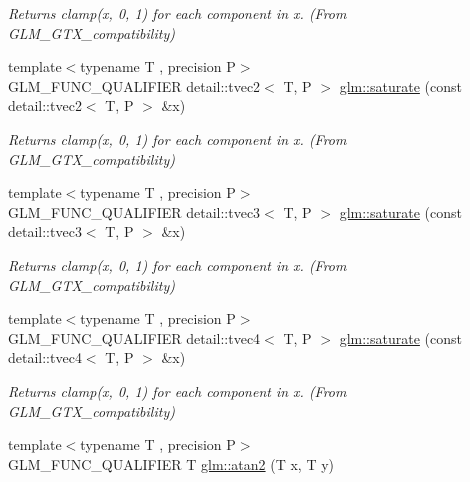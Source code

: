 \begin{DoxyCompactItemize}
\begin{DoxyCompactList}\small\item\em Returns clamp(x, 0, 1) for each component in x. (From G\+L\+M\+\_\+\+G\+T\+X\+\_\+compatibility) \end{DoxyCompactList}\item 
{\footnotesize template$<$typename T , precision P$>$ }\\G\+L\+M\+\_\+\+F\+U\+N\+C\+\_\+\+Q\+U\+A\+L\+I\+F\+I\+ER detail\+::tvec2$<$ T, P $>$ \hyperlink{group__gtx__compatibility_gab7c26da683d068e34feaa3ae90a528c1}{glm\+::saturate} (const detail\+::tvec2$<$ T, P $>$ \&x)\hypertarget{group__gtx__compatibility_gab7c26da683d068e34feaa3ae90a528c1}{}\label{group__gtx__compatibility_gab7c26da683d068e34feaa3ae90a528c1}

\begin{DoxyCompactList}\small\item\em Returns clamp(x, 0, 1) for each component in x. (From G\+L\+M\+\_\+\+G\+T\+X\+\_\+compatibility) \end{DoxyCompactList}\item 
{\footnotesize template$<$typename T , precision P$>$ }\\G\+L\+M\+\_\+\+F\+U\+N\+C\+\_\+\+Q\+U\+A\+L\+I\+F\+I\+ER detail\+::tvec3$<$ T, P $>$ \hyperlink{group__gtx__compatibility_ga367b1adb1d748e156db972cc92b42483}{glm\+::saturate} (const detail\+::tvec3$<$ T, P $>$ \&x)\hypertarget{group__gtx__compatibility_ga367b1adb1d748e156db972cc92b42483}{}\label{group__gtx__compatibility_ga367b1adb1d748e156db972cc92b42483}

\begin{DoxyCompactList}\small\item\em Returns clamp(x, 0, 1) for each component in x. (From G\+L\+M\+\_\+\+G\+T\+X\+\_\+compatibility) \end{DoxyCompactList}\item 
{\footnotesize template$<$typename T , precision P$>$ }\\G\+L\+M\+\_\+\+F\+U\+N\+C\+\_\+\+Q\+U\+A\+L\+I\+F\+I\+ER detail\+::tvec4$<$ T, P $>$ \hyperlink{group__gtx__compatibility_gaad58ab5081f38e91ba5a99a25ba6270c}{glm\+::saturate} (const detail\+::tvec4$<$ T, P $>$ \&x)\hypertarget{group__gtx__compatibility_gaad58ab5081f38e91ba5a99a25ba6270c}{}\label{group__gtx__compatibility_gaad58ab5081f38e91ba5a99a25ba6270c}

\begin{DoxyCompactList}\small\item\em Returns clamp(x, 0, 1) for each component in x. (From G\+L\+M\+\_\+\+G\+T\+X\+\_\+compatibility) \end{DoxyCompactList}\item 
{\footnotesize template$<$typename T , precision P$>$ }\\G\+L\+M\+\_\+\+F\+U\+N\+C\+\_\+\+Q\+U\+A\+L\+I\+F\+I\+ER T \hyperlink{group__gtx__compatibility_gac63011205bf6d0be82589dc56dd26708}{glm\+::atan2} (T x, T y)\hypertarget{group__gtx__compatibility_gac63011205bf6d0be82589dc56dd26708}{}\label{group__gtx__compatibility_gac63011205bf6d0be82589dc56dd26708}


\end{DoxyCompactItemize}
